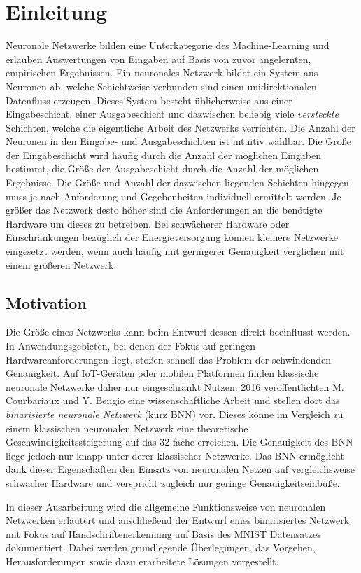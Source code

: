 \chapter{Einleitung}

Neuronale Netzwerke bilden eine Unterkategorie des Machine-Learning und erlauben
Auswertungen von Eingaben auf Basis von zuvor angelernten, empirischen
Ergebnissen.
Ein neuronales Netzwerk bildet ein System aus Neuronen ab, welche Schichtweise
verbunden sind einen unidirektionalen Datenfluss erzeugen.
Dieses System besteht üblicherweise aus einer Eingabeschicht, einer
Ausgabeschicht und dazwischen beliebig viele \emph{versteckte} Schichten,
welche die eigentliche Arbeit des Netzwerks verrichten.
Die Anzahl der Neuronen in den Eingabe- und Ausgabeschichten ist intuitiv
wählbar. Die Größe der Eingabeschicht wird häufig durch die Anzahl der
möglichen Eingaben bestimmt, die Größe der Ausgabeschicht durch die Anzahl
der möglichen Ergebnisse.
Die Größe und Anzahl der dazwischen liegenden Schichten hingegen muss je
nach Anforderung und Gegebenheiten individuell ermittelt werden.
Je größer das Netzwerk desto höher sind die Anforderungen an die benötigte
Hardware um dieses zu betreiben. Bei schwächerer Hardware oder
Einschränkungen bezüglich der Energieversorgung können kleinere Netzwerke
eingesetzt werden, wenn auch häufig mit geringerer Genauigkeit verglichen
mit einem größeren Netzwerk.


\section{Motivation}

Die Größe eines Netzwerks kann beim Entwurf dessen direkt beeinflusst werden.
In Anwendungsgebieten, bei denen der Fokus auf geringen Hardwareanforderungen
liegt, stoßen schnell das Problem der schwindenden Genauigkeit.
Auf IoT-Geräten oder mobilen Platformen finden klassische neuronale Netzwerke
daher nur eingeschränkt Nutzen.
2016 veröffentlichten M. Courbariaux und Y. Bengio \cite{Courbariaux} eine
wissenschaftliche Arbeit und stellen dort das
\emph{binarisierte neuronale Netzwerk} (kurz BNN) vor.
Dieses könne im Vergleich zu einem klassischen neuronalen Netzwerk eine
theoretische Geschwindigkeitssteigerung auf das 32-fache erreichen.
Die Genauigkeit des BNN liege jedoch nur knapp unter derer klassischer Netzwerke.
Das BNN ermöglicht dank dieser Eigenschaften den Einsatz von neuronalen Netzen
auf vergleichsweise schwacher Hardware und verspricht zugleich
nur geringe Genauigkeitseinbüße.

In dieser Ausarbeitung wird die allgemeine Funktionsweise von neuronalen
Netzwerken erläutert und anschließend der Entwurf eines binarisiertes
Netzwerk mit Fokus auf Handschriftenerkennung auf Basis des MNIST Datensatzes
dokumentiert.
Dabei werden grundlegende Überlegungen, das Vorgehen, Herausforderungen
sowie dazu erarbeitete Lösungen vorgestellt.